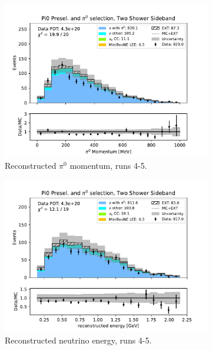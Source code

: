 \begin{figure}[H]
    \begin{subfigure}{0.33\linewidth}
        \includegraphics[width=\linewidth]{technote/Sidebands/Figures/TwoShowerSideband/two_shr_sideband_pi0momentum_run4b4c4d5_PI0_PI0.pdf}
        \caption{Reconstructed $\pi^0$ momentum, runs 4-5.}
    \end{subfigure}%
    \begin{subfigure}{0.33\linewidth}
        \includegraphics[width=\linewidth]{technote/Sidebands/Figures/TwoShowerSideband/two_shr_sideband_reco_e_run4b4c4d5_PI0_PI0.pdf}
        \caption{Reconstructed neutrino energy, runs 4-5.}
    \end{subfigure}
    \begin{subfigure}{0.33\linewidth}

\end{subfigure}
\end{figure}
